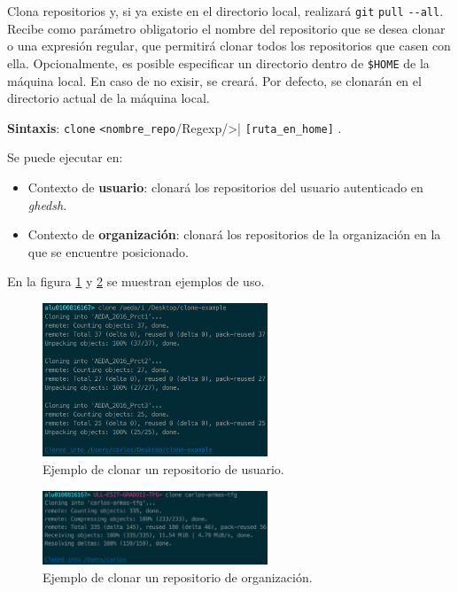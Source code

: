 Clona repositorios y, si ya existe en el directorio local, realizará \verb|git| \verb|pull| \verb|--all|. Recibe como parámetro obligatorio el nombre del repositorio que se desea clonar o una expresión regular, que permitirá clonar todos los repositorios que casen con ella.
Opcionalmente, es posible especificar un directorio dentro de \verb|$HOME|  de la máquina local. En caso de no exisir, se creará. Por defecto, se clonarán en el directorio actual de la máquina local.

\textbf{Sintaxis}: \verb|clone| \verb|<nombre_repo|/Regexp/>| \verb|[ruta_en_home]| .

Se puede ejecutar en:
\begin{itemize}
	\item Contexto de \textbf{usuario}: clonará los repositorios del usuario autenticado en {\it ghedsh}.
	\item Contexto de \textbf{organización}: clonará los repositorios de la organización en la que se encuentre posicionado.
\end{itemize}

En la figura \ref{fig:clone-example} y \ref{fig:clone-example-org} se muestran ejemplos de uso.

\begin{figure}[H]
	\begin{center}
	\includegraphics[width=0.60\textwidth]{images/clone-example.png}
	\caption{Ejemplo de clonar un repositorio de usuario.}
	\label{fig:clone-example}
	\end{center}
\end{figure}

\begin{figure}[H]
	\begin{center}
	\includegraphics[width=0.60\textwidth]{images/clone-example-org.png}
	\caption{Ejemplo de clonar un repositorio de organización.}
	\label{fig:clone-example-org}
	\end{center}
\end{figure}

